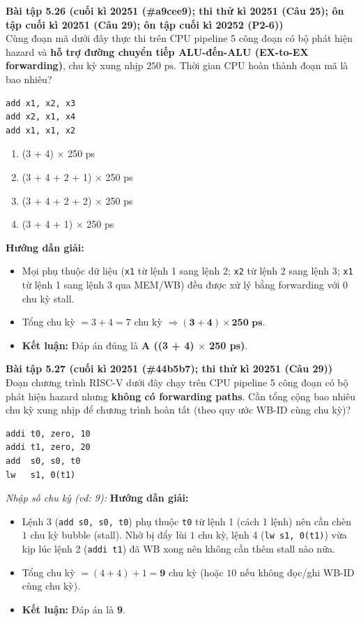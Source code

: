 \textbf{Bài tập 5.26 (cuối kì 20251 (\#a9cee9); thi thử kì 20251 (Câu 25); ôn tập cuối kì 20251 (Câu 29); ôn tập cuối kì 20252 (P2-6))}\\
Cùng đoạn mã dưới đây thực thi trên CPU pipeline 5 công đoạn có bộ phát hiện hazard và \textbf{hỗ trợ đường chuyển tiếp ALU-đến-ALU (EX-to-EX forwarding)}, chu kỳ xung nhịp $250\text{ ps}$. Thời gian CPU hoàn thành đoạn mã là bao nhiêu?
\begin{lstlisting}
add x1, x2, x3
add x2, x1, x4
add x1, x1, x2
\end{lstlisting}
\begin{enumerate}[label=\Alph*.]
    \item (3 + 4) $\times$ 250 ps
    \item (3 + 4 + 2 + 1) $\times$ 250 ps
    \item (3 + 4 + 2 + 2) $\times$ 250 ps
    \item (3 + 4 + 1) $\times$ 250 ps
\end{enumerate}
\textbf{Hướng dẫn giải:}
\begin{itemize}
    \item Mọi phụ thuộc dữ liệu (\texttt{x1} từ lệnh 1 sang lệnh 2; \texttt{x2} từ lệnh 2 sang lệnh 3; \texttt{x1} từ lệnh 1 sang lệnh 3 qua MEM/WB) đều được xử lý bằng forwarding với $0$ chu kỳ stall.
    \item Tổng chu kỳ $= 3 + 4 = 7$ chu kỳ $\Rightarrow \mathbf{(3 + 4) \times 250\text{ ps}}$.
    \item \textbf{Kết luận:} Đáp án đúng là \textbf{A ((3 + 4) $\times$ 250 ps)}.
\end{itemize}

\textbf{Bài tập 5.27 (cuối kì 20251 (\#44b5b7); thi thử kì 20251 (Câu 29))}\\
Đoạn chương trình RISC-V dưới đây chạy trên CPU pipeline 5 công đoạn có bộ phát hiện hazard nhưng \textbf{không có forwarding paths}. Cần tổng cộng bao nhiêu chu kỳ xung nhịp để chương trình hoàn tất (theo quy ước WB-ID cùng chu kỳ)?
\begin{lstlisting}
addi t0, zero, 10
addi t1, zero, 20
add  s0, s0, t0
lw   s1, 0(t1)
\end{lstlisting}
\textit{Nhập số chu kỳ (vd: 9):}
\textbf{Hướng dẫn giải:}
\begin{itemize}
    \item Lệnh 3 (\texttt{add s0, s0, t0}) phụ thuộc \texttt{t0} từ lệnh 1 (cách 1 lệnh) nên cần chèn $1$ chu kỳ bubble (stall). Nhờ bị đẩy lùi $1$ chu kỳ, lệnh 4 (\texttt{lw s1, 0(t1)}) vừa kịp lúc lệnh 2 (\texttt{addi t1}) đã WB xong nên không cần thêm stall nào nữa.
    \item Tổng chu kỳ $= (4 + 4) + 1 = \mathbf{9}$ chu kỳ (hoặc $10$ nếu không đọc/ghi WB-ID cùng chu kỳ).
    \item \textbf{Kết luận:} Đáp án là \textbf{9}.
\end{itemize}

